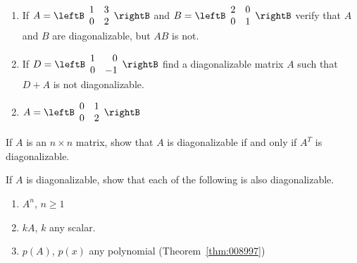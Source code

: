 \begin{multicols}{2}
\begin{ex}
\begin{sol}
\begin{enumerate}[label={\alph*.}]
\end{enumerate}
\end{sol}
\end{ex}


\begin{ex}
\begin{enumerate}[label={\alph*.}]
\item If $A = \leftB \begin{array}{rr}
1 & 3 \\
0 & 2 \end{array} \rightB$
 and $B = \leftB \begin{array}{rr}
2 & 0 \\
0 & 1 
\end{array}\rightB$
 verify that $A$ and $B$ are diagonalizable, but $AB$ is not.

\item If $D = \leftB \begin{array}{rr}
1 & 0 \\
0 & -1 
\end{array}\rightB$
 find a diagonalizable matrix $A$ such that $D + A$ is not diagonalizable.

\end{enumerate}
\begin{sol}
\begin{enumerate}[label={\alph*.}]
\setcounter{enumi}{1}
\item  $A = \leftB \begin{array}{rr}
0 & 1 \\
0 & 2 
\end{array}\rightB$ 


\end{enumerate}
\end{sol}
\end{ex}

\begin{ex}
If $A$ is an $n \times n$ matrix, show that $A$ is diagonalizable if and only if $A^{T}$ is diagonalizable.
\end{ex}

\begin{ex}
If $A$ is diagonalizable, show that each of the following is also diagonalizable.


\begin{enumerate}[label={\alph*.}]
\item $A^{n}$, $n \geq 1$

\item $kA$, $k$ any scalar.

\item $p(A)$, $p(x)$ any polynomial (Theorem~\ref{thm:008997})


\end{enumerate}
\end{ex}
\end{multicols}
